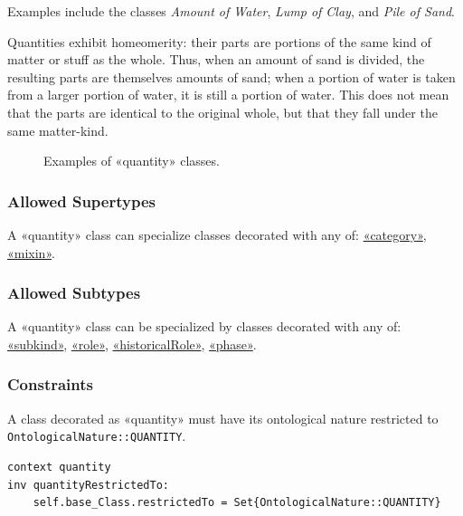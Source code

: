 Examples include the classes \textit{Amount of Water}, \textit{Lump of Clay}, and \textit{Pile of Sand}.

Quantities exhibit homeomerity: their parts are portions of the same kind of matter or stuff as the whole. Thus, when an amount of sand is divided, the resulting parts are themselves amounts of sand; when a portion of water is taken from a larger portion of water, it is still a portion of water. This does not mean that the parts are identical to the original whole, but that they fall under the same matter-kind.


\begin{figure}[h]
    \centering
    
    \caption{Examples of «quantity» classes.}
    \label{fig:quantity-example}
\end{figure}

\subsubsection{Allowed Supertypes}

A «quantity» class can specialize classes decorated with any of: 
\hyperref[stereotype:category]{«category»}, \hyperref[stereotype:mixin]{«mixin»}.

\subsubsection{Allowed Subtypes}

A «quantity» class can be specialized by classes decorated with any of:
\hyperref[stereotype:subkind]{«subkind»}, \hyperref[stereotype:role]{«role»}, \hyperref[stereotype:historicalRole]{«historicalRole»}, \hyperref[stereotype:phase]{«phase»}.

\subsubsection{Constraints}

\begin{constraint}
\label{quantityRestrictedTo}
A class decorated as «quantity» must have its ontological nature restricted to \texttt{OntologicalNature::QUANTITY}.

\begin{lstlisting}[language=OCL]
context quantity 
inv quantityRestrictedTo:
    self.base_Class.restrictedTo = Set{OntologicalNature::QUANTITY}
\end{lstlisting}
\end{constraint}

